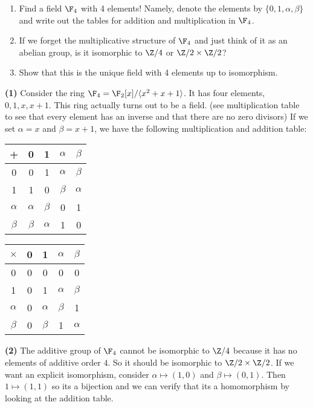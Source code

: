 \begin{problem}
  \noindent
  \begin{enumerate}
    \item Find a field $\F_4$ with 4 elements! Namely, denote the elements by $\{0, 1, \alpha, \beta\}$ and write out the tables for addition and multiplication in $\F_4$. 
    \item If we forget the multiplicative structure of $\F_4$ and just think of it as an abelian group, is it isomorphic to $\Z/4$ or $\Z/2 \times \Z/2$?
    \item Show that this is the unique field with 4 elements up to isomorphism.
  \end{enumerate}
\end{problem}

\textbf{(1)} Consider the ring $\F_4=\F_2[x]/\langle x^2+x+1 \rangle$. It has four elements, $0,1,x,x+1$. This ring actually turns out to be a field. (see multiplication table to see that every element has an inverse and that there are no zero divisors) If we set $\alpha = x$ and $\beta = x+1$, we have the following multiplication and addition table:  

\begin{center}
  \setlength\doublerulesep{0pt}
  \begin{tabular}{c||cccc}
  + & 0 & 1 & $\alpha$ & $\beta$  \\
  \hline\hline
  0         & 0 & 1 & $\alpha$  & $\beta$  \\ 
  1         & 1 & 0 & $\beta$  & $\alpha$  \\ 
  $\alpha$  & $\alpha$  & $\beta$  & 0 & 1 \\ 
  $\beta$   & $\beta$  & $\alpha$  & 1 & 0 \\ 
  \end{tabular}
  \quad\quad
  \setlength\doublerulesep{0pt}
  \begin{tabular}{c||cccc}
    $\times$  & 0 & 1 & $\alpha$ & $\beta$  \\
    \hline\hline
    0         & 0 & 0 & 0  & 0  \\ 
    1         & 0 & 1 & $\alpha$  & $\beta$  \\ 
    $\alpha$  & 0  & $\alpha$  & $\beta$  & 1 \\ 
    $\beta$   & 0  & $\beta$  & 1 & $\alpha$  \\ 
    \end{tabular}
\end{center}

\textbf{(2)} The additive group of $\F_4$ cannot be isomorphic to $\Z /4$ because it has no elements of additive order $4$. So it should be isomorphic to $\Z /2\times \Z /2$. If we want an explicit isomorphism, consider $\alpha \mapsto (1,0)$ and $\beta \mapsto (0,1)$. Then $1\mapsto (1,1)$ so its a bijection and we can verify that its a homomorphism by looking at the addition table. 

